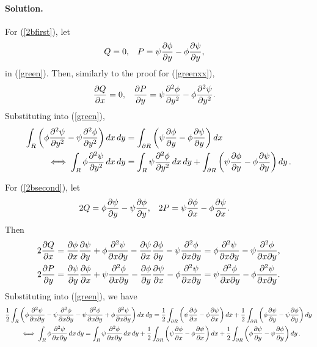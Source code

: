 \documentclass[11pt]{article}
\newcommand{\refeq}[1]{(\ref{#1})}
\newenvironment{solution}
{
    \paragraph{Solution.}
    \ignorespaces
}
{
}
\begin{document}
\begin{solution}
	For \refeq{2bfirst}, let
	\begin{align*}
		Q &= 0, &
		P &= \psi \pdv{\phi}{y} - \phi \pdv{\psi}{y},
	\end{align*}
	in \refeq{green}.  Then, similarly to the proof for \refeq{greenxx},
	\begin{align*}
		\pdv{Q}{x} &= 0, &
		\pdv{P}{y} &= \psi \pdv[2]{\phi}{y} - \phi \pdv[2]{\psi}{y}.
	\end{align*}
	Substituting into \refeq{green},
	\begin{align}
		\int_R \left( \phi \pdv[2]{\psi}{y} - \psi \pdv[2]{\phi}{y} \right) \dd{x} \dd{y} &= \int_{\partial R} \left( \psi \pdv{\phi}{y} - \phi \pdv{\psi}{y} \right) \dd{x} \notag \\
		\iff \int_R \phi \pdv[2]{\psi}{y} \dd{x} \dd{y} &= \int_R \psi \pdv[2]{\phi}{y} \dd{x} \dd{y} + \int_{\partial R} \left( \psi \pdv{\phi}{y} - \phi \pdv{\psi}{y} \right) \dd{y}. \label{greenyy}
	\end{align}
	
	For \refeq{2bsecond}, let
	\begin{align*}
		2Q &= \phi \pdv{\psi}{y} - \psi \pdv{\phi}{y}, &
		2P &= \psi \pdv{\phi}{x} - \phi \pdv{\psi}{x}.
	\end{align*}
	Then
	\begin{align*}
		2 \pdv{Q}{x} &= \pdv{\phi}{x} \pdv{\psi}{y} + \phi \pdv{\psi}{x}{y} - \pdv{\psi}{x} \pdv{\phi}{y} - \psi \pdv{\phi}{x}{y} = \phi \pdv{\psi}{x}{y} - \psi \pdv{\phi}{x}{y}, \\
		2 \pdv{P}{y} &= \pdv{\psi}{y} \pdv{\phi}{x} + \psi \pdv{\phi}{x}{y} - \pdv{\phi}{y} \pdv{\psi}{x} - \phi \pdv{\psi}{x}{y} = \psi \pdv{\phi}{x}{y} - \phi \pdv{\psi}{x}{y}.
	\end{align*}
	Substituting into \refeq{green}, we have
	\begin{align}
		\frac{1}{2} \int_R &\left( \phi \pdv{\psi}{x}{y} - \psi \pdv{\phi}{x}{y} - \psi \pdv{\phi}{x}{y} + \phi \pdv{\psi}{x}{y} \right) \dd{x} \dd{y} = \frac{1}{2} \int_{\partial R} \left( \psi \pdv{\phi}{x} - \phi \pdv{\psi}{x} \right) \dd{x} + \frac{1}{2} \int_{\partial R} \left( \phi \pdv{\psi}{y} - \psi \pdv{\phi}{y} \right) \dd{y} \notag \\
		&\iff \int_R \phi \pdv{\psi}{x}{y} \dd{x} \dd{y} = \int_R \psi \pdv{\phi}{x}{y} \dd{x} \dd{y} + \frac{1}{2} \int_{\partial R} \left( \psi \pdv{\phi}{x} - \phi \pdv{\psi}{x} \right) \dd{x} + \frac{1}{2} \int_{\partial R} \left( \phi \pdv{\psi}{y} - \psi \pdv{\phi}{y} \right) \dd{y}. \label{greenxy}
	\end{align}
\end{solution}
\end{document}
